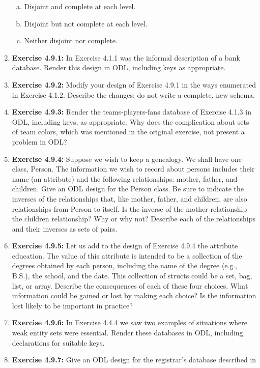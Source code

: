 \documentclass[12pt]{article}
\begin{document}
\begin{enumerate}[1.]
    \begin{enumerate}[a)]
        \item Disjoint and complete at each level.
        \item Disjoint but not complete at each level.
        \item Neither disjoint nor complete.
    \end{enumerate}

    \item \textbf{Exercise 4.9.1:} In Exercise 4.1.1 was the informal description of a bank database. Render this design in ODL, including keys as appropriate.
    \item \textbf{Exercise 4.9.2:} Modify your design of Exercise 4.9.1 in the ways enumerated in Exercise 4.1.2. Describe the changes; do not write a complete, new schema.
    \item \textbf{Exercise 4.9.3:} Render the teams-players-fans database of Exercise 4.1.3 in ODL, including keys, as appropriate. Why does the complication about sets of team colors, which was mentioned in the original exercise, not present a problem in ODL?
    \item \textbf{Exercise 4.9.4:} Suppose we wish to keep a genealogy. We shall have one class, Person. The information we wish to record about persons includes their name (an attribute) and the following relationships: mother, father, and children. Give an ODL design for the Person class. Be sure to indicate the inverses of the relationships that, like mother, father, and children, are also relationships from Person to itself. Is the inverse of the mother relationship the children relationship? Why or why not? Describe each of the relationships and their inverses as sets of pairs.
    \item \textbf{Exercise 4.9.5:} Let us add to the design of Exercise 4.9.4 the attribute education. The value of this attribute is intended to be a collection of the degrees obtained by each person, including the name of the degree (e.g., B.S.), the school, and the date. This collection of structs could be a set, bag, list, or array. Describe the consequences of each of these four choices. What information could be gained or lost by making each choice? Is the information lost likely to be important in practice?
    \item \textbf{Exercise 4.9.6:} In Exercise 4.4.4 we saw two examples of situations where weak entity sets were essential. Render these databases in ODL, including declarations for suitable keys.
    \item \textbf{Exercise 4.9.7:} Give an ODL design for the registrar's database described in
\end{enumerate}
\end{document}

